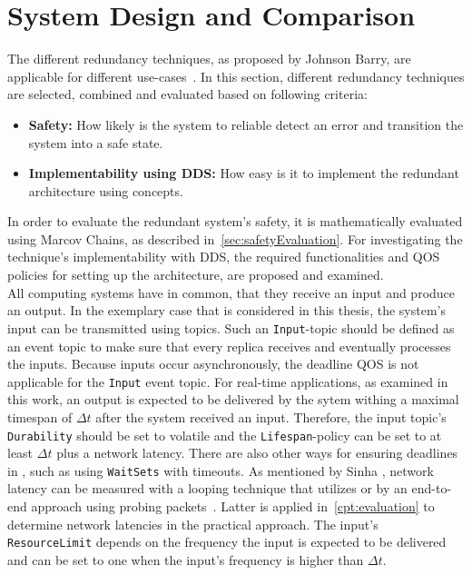 
\section{System Design and Comparison}
The different redundancy techniques, as proposed by Johnson Barry, are applicable for different use-cases~\cite{BarryFaultToleranceAnalysis}.
In this section, different redundancy techniques are selected, combined and evaluated based on following criteria:

\begin{itemize}
\item \textbf{Safety:} How likely is the system to reliable detect an error and transition the system into a safe state.
\item \textbf{Implementability using \gls*{DDS}:} How easy is it to implement the redundant architecture using  concepts.
\end{itemize}

In order to evaluate the redundant system's safety, it is mathematically evaluated using Marcov Chains, as described in~\autoref{sec:safetyEvaluation}.
For investigating the technique's implementability with \gls*{DDS}, the required functionalities and \gls*{QOS} policies for setting up the architecture, are proposed and examined.
\\

All computing systems have in common, that they receive an input and produce an output.
In the exemplary case that is considered in this thesis, the system's input can be transmitted using  topics.
Such an \texttt{Input}-topic should be defined as an event topic to make sure that every replica receives and eventually processes the inputs.
Because inputs occur asynchronously, the deadline \gls*{QOS} is not applicable for the \texttt{Input} event topic.
For real-time applications, as examined in this work, an output is expected to be delivered by the sytem withing a maximal timespan of $\Delta t$ after the system received an input.
Therefore, the input topic's \texttt{Durability} should be set to volatile and the \texttt{Lifespan}-policy can be set to at least $\Delta t$ plus a network latency.
There are also other ways for ensuring deadlines in , such as using \texttt{WaitSets} with timeouts.
As mentioned by Sinha \etal, network latency can be measured with a looping technique that utilizes   or by an end-to-end approach using probing packets~\cite{SinhaMeasureNetworkLatency}.
Latter is applied in~\autoref{cpt:evaluation} to determine network latencies in the practical approach.
The input's \texttt{ResourceLimit} depends on the frequency the input is expected to be delivered and can be set to one when the input's frequency is higher than $\Delta t$.
\\

